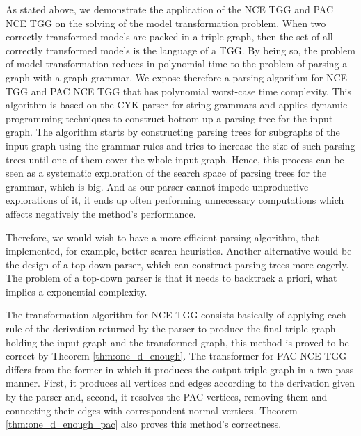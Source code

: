 As stated above, we demonstrate the application of the NCE TGG and PAC NCE TGG on the solving of the model transformation problem. When two correctly transformed models are packed in a triple graph, then the set of all correctly transformed models is the language of a TGG. By being so, the problem of model transformation reduces in polynomial time to the problem of parsing a graph with a graph grammar. We expose therefore a parsing algorithm for NCE TGG \cite{rozenberg1986boundary} and PAC NCE TGG that has polynomial worst-case time complexity. This algorithm is based on the CYK parser for string grammars and applies dynamic programming techniques to construct bottom-up a parsing tree for the input graph. The algorithm starts by constructing parsing trees for subgraphs of the input graph using the grammar rules and tries to increase the size of such parsing trees until one of them cover the whole input graph. Hence, this process can be seen as a systematic exploration of the search space of parsing trees for the grammar, which is big. And as our parser cannot impede unproductive explorations of it, it ends up often performing unnecessary computations which affects negatively the method's performance.

Therefore, we would wish to have a more efficient parsing algorithm, that implemented, for example, better search heuristics. Another alternative would be the design of a top-down parser, which can construct parsing trees more eagerly. The problem of a top-down parser is that it needs to backtrack a priori, what implies a exponential complexity.
 
The transformation algorithm for NCE TGG consists basically of applying each rule of the derivation returned by the parser to produce the final triple graph holding the input graph and the transformed graph, this method is proved to be correct by Theorem \ref{thm:one_d_enough}. The transformer for PAC NCE TGG differs from the former in which it produces the output triple graph in a two-pass manner. First, it produces all vertices and edges according to the derivation given by the parser and, second, it resolves the PAC vertices, removing them and connecting their edges with correspondent normal vertices. Theorem \ref{thm:one_d_enough_pac} also proves this method's correctness.



